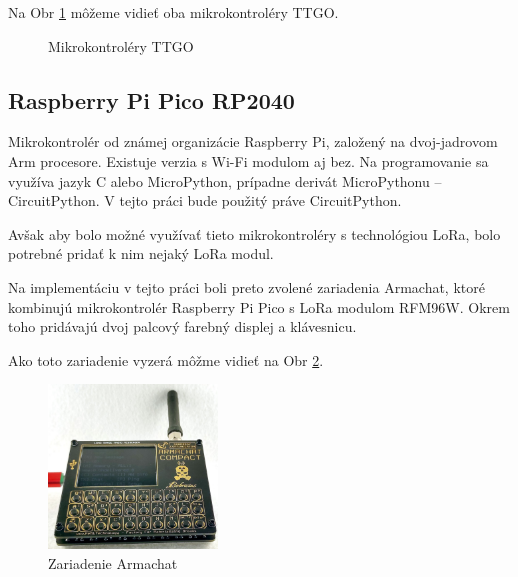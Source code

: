 \documentclass[slovak,master]{diploma}
\begin{document}
Na Obr \ref{fig:ttgo-moduly} môžeme vidieť oba mikrokontroléry TTGO.
\begin{figure}[h!]
  \centering
  \qquad
  \caption{Mikrokontroléry TTGO}
  \label{fig:ttgo-moduly}
\end{figure}

\subsection{Raspberry Pi Pico RP2040}
Mikrokontrolér od známej organizácie Raspberry Pi, založený na dvoj-jadrovom Arm procesore. 
Existuje verzia s Wi-Fi modulom aj bez. Na programovanie sa využíva jazyk C alebo MicroPython, 
prípadne derivát MicroPythonu -- CircuitPython. V tejto práci bude použitý práve CircuitPython.

Avšak aby bolo možné využívať tieto mikrokontroléry s technológiou LoRa, bolo potrebné pridať k nim nejaký LoRa modul.

Na implementáciu v tejto práci boli preto zvolené zariadenia Armachat, ktoré kombinujú mikrokontrolér Raspberry Pi Pico s LoRa modulom RFM96W.
Okrem toho pridávajú dvoj palcový farebný displej a klávesnicu.

Ako toto zariadenie vyzerá môžme vidieť na Obr \ref{fig:armachat}.

\begin{figure}[h!]
	\centering
	\includegraphics[width=0.4\textwidth]{Figures/armachat.jpg}
	\caption{Zariadenie Armachat}
	\label{fig:armachat}
\end{figure}
\end{document}
